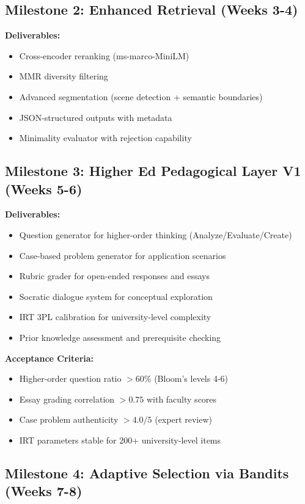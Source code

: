 \documentclass[11pt,a4paper]{report}
\begin{document}
\subsection{Milestone 2: Enhanced Retrieval (Weeks 3-4)}

\textbf{Deliverables:}
\begin{itemize}
    \item Cross-encoder reranking (ms-marco-MiniLM)
    \item MMR diversity filtering
    \item Advanced segmentation (scene detection + semantic boundaries)
    \item JSON-structured outputs with metadata
    \item Minimality evaluator with rejection capability
\end{itemize}

\subsection{Milestone 3: Higher Ed Pedagogical Layer V1 (Weeks 5-6)}

\textbf{Deliverables:}
\begin{itemize}
    \item Question generator for higher-order thinking (Analyze/Evaluate/Create)
    \item Case-based problem generator for application scenarios
    \item Rubric grader for open-ended responses and essays
    \item Socratic dialogue system for conceptual exploration
    \item IRT 3PL calibration for university-level complexity
    \item Prior knowledge assessment and prerequisite checking
\end{itemize}

\textbf{Acceptance Criteria:}
\begin{itemize}
    \item Higher-order question ratio $>60\%$ (Bloom's levels 4-6)
    \item Essay grading correlation $>0.75$ with faculty scores
    \item Case problem authenticity $>4.0/5$ (expert review)
    \item IRT parameters stable for 200+ university-level items
\end{itemize}

\subsection{Milestone 4: Adaptive Selection via Bandits (Weeks 7-8)}
\end{document}

